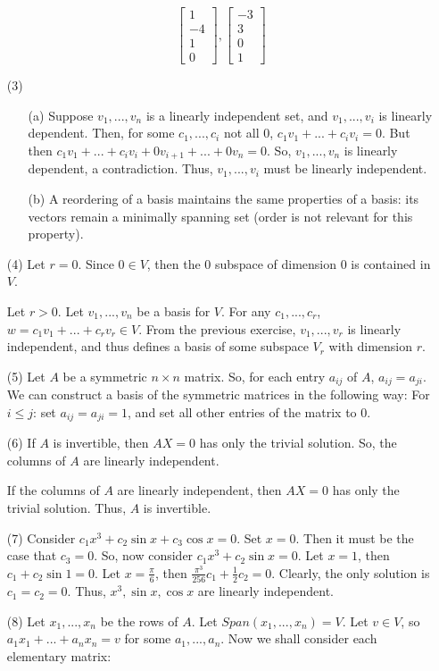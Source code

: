 \documentclass[12pt]{article}
\begin{document}
\begin{itemize}
$$\begin{bmatrix}
1 \\
-4 \\
1 \\
0
\end{bmatrix}, \begin{bmatrix}
-3 \\
3 \\
0 \\
1
\end{bmatrix}$$
\item[(3)]
\begin{itemize}
\item[(a)]
Suppose $v_1, ..., v_n$ is a linearly independent set, and $v_1, ..., v_i$ is linearly dependent. Then, for some $c_1, ..., c_i$ not all 0, $c_1v_1 + ... + c_iv_i = 0$. But then $c_1v_1 + ... + c_iv_i + 0v_{i+1} + ... + 0v_n = 0$. So, $v_1, ..., v_n$ is linearly dependent, a contradiction. Thus, $v_1, ..., v_i$ must be linearly independent.
\item[(b)]
A reordering of a basis maintains the same properties of a basis: its vectors remain a minimally spanning set (order is not relevant for this property).
\end{itemize}
\item[(4)]
Let $r = 0$. Since $0 \in V$, then the 0 subspace of dimension 0 is contained in $V$.

Let $r > 0$. Let $v_1, ..., v_n$ be a basis for $V$. For any $c_1, ..., c_r$, $w = c_1v_1 + ... + c_rv_r \in V$. From the previous exercise, $v_1, ..., v_r$ is linearly independent, and thus defines a basis of some subspace $V_r$ with dimension $r$.
\item[(5)]
Let $A$ be a symmetric $n \times n$ matrix. So, for each entry $a_{ij}$ of $A$, $a_{ij} = a_{ji}$. We can construct a basis of the symmetric matrices in the following way: For $i \leq j$: set $a_{ij} = a_{ji} = 1$, and set all other entries of the matrix to 0.
\item[(6)]
If $A$ is invertible, then $AX = 0$ has only the trivial solution. So, the columns of $A$ are linearly independent.

If the columns of $A$ are linearly independent, then $AX = 0$ has only the trivial solution. Thus, $A$ is invertible.
\item[(7)]
Consider $c_1x^3 + c_2\sin x + c_3\cos x = 0$. Set $x = 0$. Then it must be the case that $c_3 = 0$. So, now consider $c_1x^3 + c_2\sin x = 0$. Let $x = 1$, then $c_1 + c_2\sin 1 = 0$. Let $x = \frac{\pi}{6}$, then $\frac{\pi^3}{256}c_1 + \frac{1}{2}c_2 = 0$. Clearly, the only solution is $c_1 = c_2 = 0$. Thus, $x^3, \sin x, \cos x$ are linearly independent.
\item[(8)]
Let $x_1, ..., x_n$ be the rows of $A$. Let $Span(x_1, ..., x_n) = V$. Let $v \in V$, so $a_1x_1 + ... + a_nx_n = v$ for some $a_1, ..., a_n$. Now we shall consider each elementary matrix:


\end{itemize}
\end{document}
